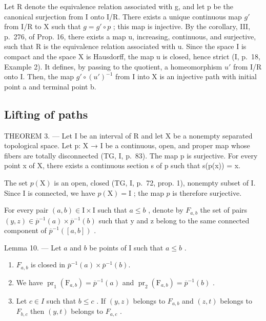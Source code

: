 Let R denote the equivalence relation associated with g, and let p be the canonical surjection from I onto I/R. There exists a unique continuous map \(g'\) from I/R to X such that \(g = g' \circ p\) ; this map is injective. By the corollary, III, p.~276, of Prop. 16, there exists a map u, increasing, continuous, and surjective, such that R is the equivalence relation associated with u. Since the space I is compact and the space X is Hausdorff, the map u is closed, hence strict (I, p.~18, Example 2). It defines, by passing to the quotient, a homeomorphism \(u'\) from I/R onto I. Then, the map \(g' \circ (u')^{-1}\) from I into X is an injective path with initial point a and terminal point b.

\subsection{Lifting of paths}

THEOREM 3. --- Let I be an interval of R and let X be a nonempty separated topological space. Let p: X → I be a continuous, open, and proper map whose fibers are totally disconnected (TG, I, p.~83). The map p is surjective. For every point x of X, there exists a continuous section s of p such that s(p(x)) = x.

The set \(p(\mathrm{X})\) is an open, closed (TG, I, p.~72, prop. 1), nonempty subset of I. Since I is connected, we have \(p(\mathrm{X}) = \mathrm{I}\) ; the map \(p\) is therefore surjective.

For every pair \((a,b)\in\mathrm{I}\times\mathrm{I}\) such that \(a\leqslant b\) , denote by \(F_{a,b}\) the set of pairs \((y,z)\in\overline{p}^{-1}(a)\times\overline{p}^{-1}(b)\) such that y and z belong to the same connected component of \(\overline{p}^{-1}([a,b])\) .

Lemma 10. --- Let \(a\) and \(b\) be points of I such that \(a \leqslant b\) .

\begin{enumerate}
\def\labelenumi{\alph{enumi})}
\item
  \(F_{a,b}\) is closed in \(\overline{p}^{-1}(a)\times\overline{p}^{-1}(b)\).
\item
  We have \(\operatorname{pr}_1(\mathrm{F}_{a,b}) = \overline{p}^{-1}(a)\) and \(\operatorname{pr}_2(\mathrm{F}_{a,b}) = \overline{p}^{-1}(b)\) .
\item
  Let \(c \in I\) such that \(b \leqslant c\) . If \((y,z)\) belongs to \(F_{a,b}\) and \((z,t)\) belongs to \(F_{b,c}\) then \((y,t)\) belongs to \(F_{a,c}\) .
\end{enumerate}

